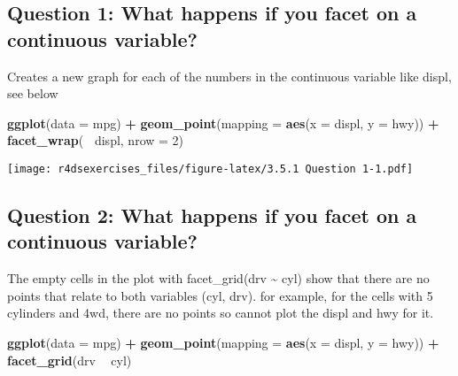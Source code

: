\documentclass[
]{book}
\newenvironment{Shaded}{\begin{snugshade}}{\end{snugshade}}
\newcommand{\DataTypeTok}[1]{\textcolor[rgb]{0.13,0.29,0.53}{#1}}
\newcommand{\DecValTok}[1]{\textcolor[rgb]{0.00,0.00,0.81}{#1}}
\newcommand{\KeywordTok}[1]{\textcolor[rgb]{0.13,0.29,0.53}{\textbf{#1}}}
\newcommand{\NormalTok}[1]{#1}
\newcommand{\OperatorTok}[1]{\textcolor[rgb]{0.81,0.36,0.00}{\textbf{#1}}}
\newcommand{\StringTok}[1]{\textcolor[rgb]{0.31,0.60,0.02}{#1}}
\begin{document}
\hypertarget{question-1-what-happens-if-you-facet-on-a-continuous-variable}{%
\subsection{Question 1: What happens if you facet on a continuous variable?}\label{question-1-what-happens-if-you-facet-on-a-continuous-variable}}

Creates a new graph for each of the numbers in the continuous variable like displ, see below

\begin{Shaded}
\begin{Highlighting}[]
\KeywordTok{ggplot}\NormalTok{(}\DataTypeTok{data =}\NormalTok{ mpg) }\OperatorTok{+}\StringTok{ }
\StringTok{  }\KeywordTok{geom_point}\NormalTok{(}\DataTypeTok{mapping =} \KeywordTok{aes}\NormalTok{(}\DataTypeTok{x =}\NormalTok{ displ, }\DataTypeTok{y =}\NormalTok{ hwy)) }\OperatorTok{+}\StringTok{ }
\StringTok{  }\KeywordTok{facet_wrap}\NormalTok{(}\OperatorTok{~}\StringTok{ }\NormalTok{displ, }\DataTypeTok{nrow =} \DecValTok{2}\NormalTok{)}
\end{Highlighting}
\end{Shaded}

\texttt{[image: r4dsexercises\_files/figure-latex/3.5.1 Question 1-1.pdf]}

\hypertarget{question-2-what-happens-if-you-facet-on-a-continuous-variable}{%
\subsection{Question 2: What happens if you facet on a continuous variable?}\label{question-2-what-happens-if-you-facet-on-a-continuous-variable}}

The empty cells in the plot with facet\_grid(drv \textasciitilde{} cyl) show that there are no points that relate to both variables (cyl, drv). for example, for the cells with 5 cylinders and 4wd, there are no points so cannot plot the displ and hwy for it.

\begin{Shaded}
\begin{Highlighting}[]
\KeywordTok{ggplot}\NormalTok{(}\DataTypeTok{data =}\NormalTok{ mpg) }\OperatorTok{+}\StringTok{ }
\StringTok{  }\KeywordTok{geom_point}\NormalTok{(}\DataTypeTok{mapping =} \KeywordTok{aes}\NormalTok{(}\DataTypeTok{x =}\NormalTok{ displ, }\DataTypeTok{y =}\NormalTok{ hwy)) }\OperatorTok{+}\StringTok{ }
\StringTok{  }\KeywordTok{facet_grid}\NormalTok{(drv }\OperatorTok{~}\StringTok{ }\NormalTok{cyl)}
\end{Highlighting}
\end{Shaded}
\end{document}
